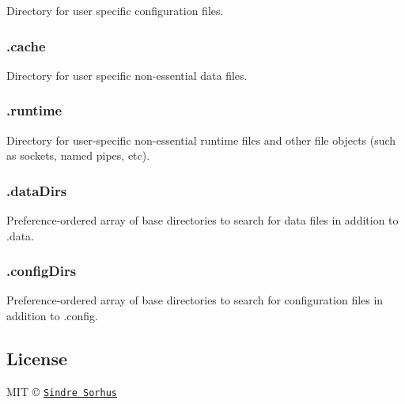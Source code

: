 Directory for user specific configuration files.

\subsubsection*{.cache}

Directory for user specific non-\/essential data files.

\subsubsection*{.runtime}

Directory for user-\/specific non-\/essential runtime files and other file objects (such as sockets, named pipes, etc).

\subsubsection*{.data\+Dirs}

Preference-\/ordered array of base directories to search for data files in addition to {\ttfamily .data}.

\subsubsection*{.config\+Dirs}

Preference-\/ordered array of base directories to search for configuration files in addition to {\ttfamily .config}.

\subsection*{License}

M\+IT © \href{https://sindresorhus.com}{\tt Sindre Sorhus} 